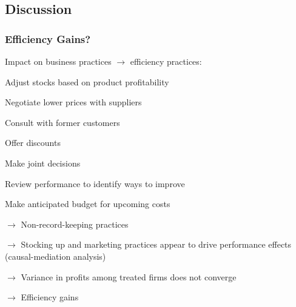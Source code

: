 \documentclass[hideothersubsections, usenames,dvipsnames,11pt]{beamer}
\newenvironment{itemize_2pt}{\itemize\addtolength{\itemsep}{2pt}}{\enditemize}
\begin{document}
\subsection{Discussion}
\begin{frame}
\frametitle{Efficiency Gains?}
Impact on business practices $\rightarrow$ \textcolor{bdf}{efficiency practices}:
\vspace{0.1in}
\begin{itemize_2pt}
	\item Adjust stocks based on product profitability
	\item Negotiate lower prices with suppliers
	\item Consult with former customers
	\item Offer discounts
	\item Make joint decisions
	\item Review performance to identify ways to improve
	\item Make anticipated budget for upcoming costs

	\pause
	
	\item[] $\rightarrow$ \textcolor{bdf}{Non-record-keeping practices}
	\item[] $\rightarrow$ \textcolor{bdf}{Stocking up and marketing practices} appear to drive performance effects (causal-mediation analysis)
	\item[] $\rightarrow$ Variance in profits among treated firms does not converge
	\item[] $\rightarrow$ \textcolor{bdf}{Efficiency gains}
\end{itemize_2pt}
\end{frame}
\end{document}
